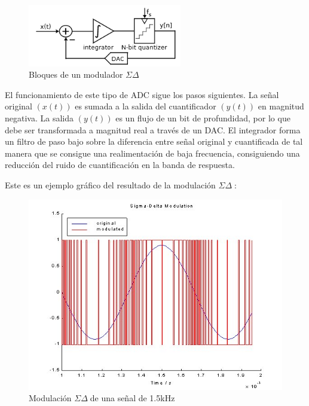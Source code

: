 \documentclass[12pt]{report} %
\newcommand{\sigmadelta}{$\Sigma\Delta\; $}
\begin{document}
	\begin{figure}[H]
		\includegraphics[width=0.6\textwidth]{sigma-delta-blocks.png}
		\caption[Bloques de un modulador \sigmadelta]{Bloques de un modulador \sigmadelta\protect\footnotemark}
		\label{fig:sigma-delta-blocks.png}
	\end{figure}
	
	El funcionamiento de este tipo de ADC sigue los pasos siguientes. La señal original $( x(t) )$ es sumada a la salida del cuantificador $( y(t) )$ en magnitud negativa. La salida $( y(t) )$ es un flujo de un bit de profundidad, por lo que debe ser transformada a magnitud real a través de un DAC. El integrador forma un filtro de paso bajo sobre la diferencia entre señal original y cuantificada de tal manera que se consigue una realimentación de baja frecuencia, consiguiendo una reducción del ruido de cuantificación en la banda de respuesta.
	
	Este es un ejemplo gráfico del resultado de la modulación \sigmadelta:
	
	\begin{figure}[H]
		\includegraphics[width=\textwidth]{sd-modulation-example.jpg}
		\caption[Modulación \sigmadelta de una señal de 1.5kHz]{Modulación \sigmadelta de una señal de 1.5kHz\protect\footnotemark}
		\label{fig:sd-modulation-example.jpg}
	\end{figure}
\end{document}
